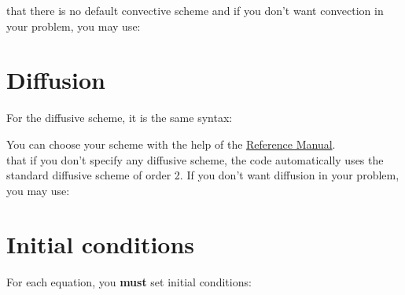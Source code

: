 \Note that there is no default convective scheme and if you don't want convection in your problem, you may use:

    \begin{center}
    \end{center}

\section{Diffusion}
For the diffusive scheme, it is the same syntax:

    \begin{center}
    \end{center}

You can choose your scheme with the help of the \href{\REFERENCEMANUAL\#blocdiffusion}{\trustref Reference Manual}.\\

\Note that if you don't specify any diffusive scheme, the code automatically uses the standard diffusive scheme of order 2.
If you don't want diffusion in your problem, you may use:

    \begin{center}
    \end{center}






\section{Initial conditions}
For each equation, you \textbf{must} set initial conditions:
\begin{center}
\end{center}

